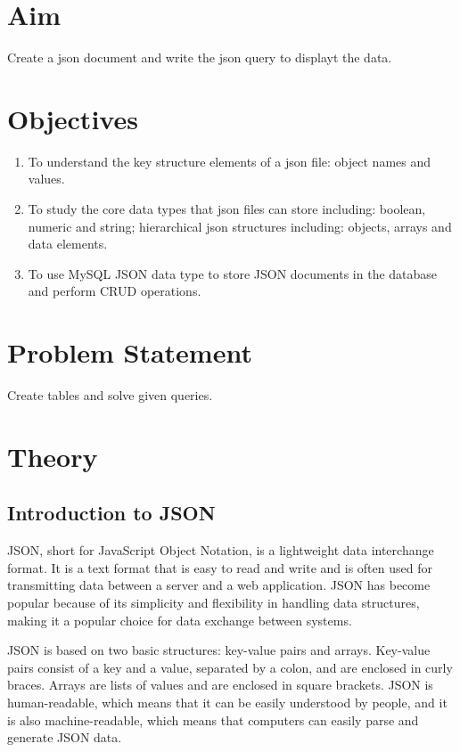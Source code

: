 \documentclass[11pt]{article}
\begin{document}
\tableofcontents
\thispagestyle{empty}
\clearpage

\setcounter{page}{1}

\section{Aim}
Create a json document and write the json query to displayt the data.

\section{Objectives}
\begin{enumerate}
    \item To understand the key structure elements of a json file: object names and
          values.
    \item To study the core data types that json files can store including: boolean,
          numeric and string; hierarchical json structures including: objects, arrays and
          data elements.
    \item To use MySQL JSON data type to store JSON documents in the database
          and perform CRUD operations.\end{enumerate}

\section{Problem Statement}
Create tables and solve given queries.

\section{Theory}

\subsection{Introduction to JSON}

JSON, short for JavaScript Object Notation, is a lightweight data interchange format. It is a text format that is easy to read and write and is often used for transmitting data between a server and a web application. JSON has become popular because of its simplicity and flexibility in handling data structures, making it a popular choice for data exchange between systems.

JSON is based on two basic structures: key-value pairs and arrays. Key-value pairs consist of a key and a value, separated by a colon, and are enclosed in curly braces. Arrays are lists of values and are enclosed in square brackets. JSON is human-readable, which means that it can be easily understood by people, and it is also machine-readable, which means that computers can easily parse and generate JSON data.
\end{document}
